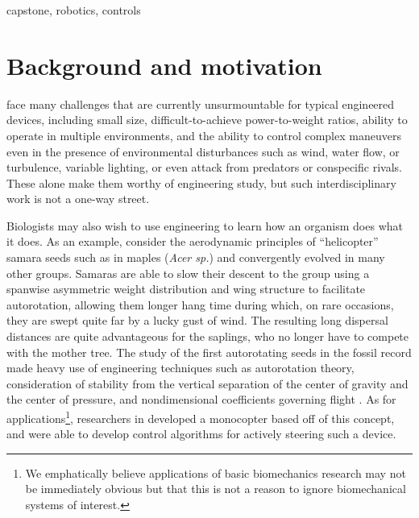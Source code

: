 \documentclass[onecolumn,10pt]{IEEEtran}
\begin{document}
\begin{IEEEkeywords}
capstone, robotics, controls
\end{IEEEkeywords}

\section{Background and motivation}
 face many challenges that are currently unsurmountable for typical engineered devices, including small size, difficult-to-achieve power-to-weight ratios, ability to operate in multiple environments, and the ability to control complex maneuvers even in the presence of environmental disturbances such as wind, water flow, or turbulence, variable lighting, or even attack from predators or conspecific rivals. These alone make them worthy of engineering study, but such interdisciplinary work is not a one-way street. 

Biologists may also wish to use engineering to learn how an organism does what it does.  As an example, consider the aerodynamic principles of ``helicopter'' samara seeds such as in maples (\emph{Acer sp.}) and convergently evolved in many other groups.  Samaras are able to slow their descent to the group using a spanwise asymmetric weight distribution and wing structure to facilitate autorotation, allowing them longer hang time during which, on rare occasions, they are swept quite far by a lucky gust of wind. The resulting long dispersal distances are quite advantageous for the saplings, who no longer have to compete with the mother tree. The study of the first autorotating seeds in the fossil record made heavy use of engineering techniques such as autorotation theory, consideration of stability from the vertical separation of the center of gravity and the center of pressure, and nondimensional coefficients governing flight \cite{stevenson2015when}.  As for applications\footnote{We emphatically believe applications of basic biomechanics research may not be immediately obvious but that this is not a reason to ignore biomechanical systems of interest.}, researchers in \cite{who2019maple} developed a monocopter based off of this concept, and were able to develop control algorithms for actively steering such a device. 
\end{document}
